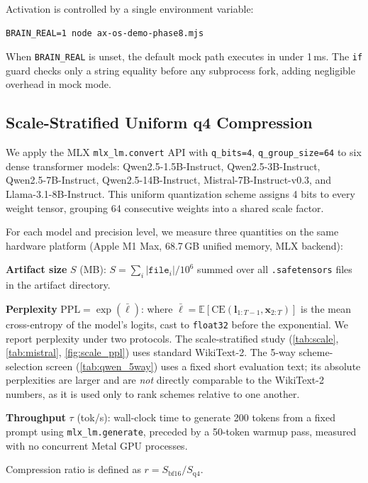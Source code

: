 \documentclass[10pt,twocolumn]{article}
\begin{document}
Activation is controlled by a single environment variable:
\begin{verbatim}
BRAIN_REAL=1 node ax-os-demo-phase8.mjs
\end{verbatim}
When \texttt{BRAIN\_REAL} is unset, the default mock path executes in under
1\,ms.  The \texttt{if} guard checks only a string equality before any subprocess
fork, adding negligible overhead in mock mode.

\subsection{Scale-Stratified Uniform q4 Compression}
\label{sec:method:aeq}

We apply the MLX \texttt{mlx\_lm.convert} API with \texttt{q\_bits=4},
\texttt{q\_group\_size=64} to six dense transformer models: Qwen2.5-1.5B-Instruct,
Qwen2.5-3B-Instruct, Qwen2.5-7B-Instruct, Qwen2.5-14B-Instruct, Mistral-7B-Instruct-v0.3,
and Llama-3.1-8B-Instruct.  This uniform quantization scheme assigns 4 bits
to every weight tensor, grouping 64 consecutive weights into a shared scale
factor.

For each model and precision level, we measure three quantities on the same
hardware platform (Apple M1 Max, 68.7\,GB unified memory, MLX backend):

\noindent\textbf{Artifact size} $S$ (MB): $S = \sum_i |\texttt{file}_i| / 10^6$
  summed over all \texttt{.safetensors} files in the artifact directory.

\noindent\textbf{Perplexity} $\text{PPL} = \exp(\bar{\ell})$: where
$\bar{\ell} = \mathbb{E}[\text{CE}(\mathbf{l}_{1:T-1}, \mathbf{x}_{2:T})]$
is the mean cross-entropy of the model's logits, cast to \texttt{float32}
before the exponential.  We report perplexity under two protocols.  The
scale-stratified study (\cref{tab:scale}, \cref{tab:mistral},
\cref{fig:scale_ppl}) uses standard WikiText-2.  The 5-way scheme-selection
screen (\cref{tab:qwen_5way}) uses a fixed short evaluation text; its absolute
perplexities are larger and are \emph{not} directly comparable to the
WikiText-2 numbers, as it is used only to rank schemes relative to one another.

\noindent\textbf{Throughput} $\tau$ (tok/s): wall-clock time to generate 200
tokens from a fixed prompt using \texttt{mlx\_lm.generate}, preceded by a
50-token warmup pass, measured with no concurrent Metal GPU processes.

Compression ratio is defined as $r = S_\text{bf16} / S_\text{q4}$.
\end{document}
